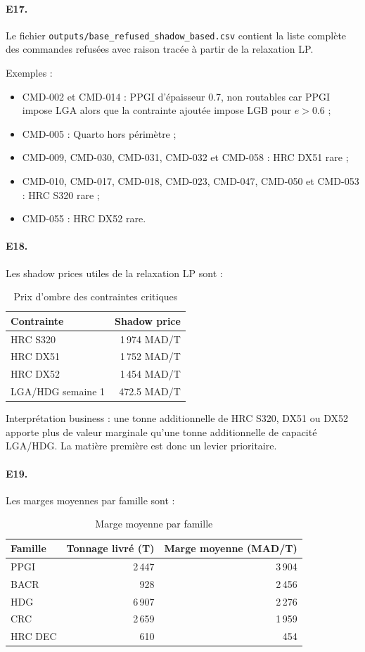 \documentclass[12pt,a4paper]{article}
\newcommand{\question}[1]{\paragraph{\textcolor{blue!50!black}{#1.}}}
\begin{document}
\question{E17}
Le fichier \texttt{outputs/base\_refused\_shadow\_based.csv} contient la liste complète des commandes refusées avec raison tracée à partir de la relaxation LP.

Exemples :

\begin{itemize}
    \item CMD-002 et CMD-014 : PPGI d'épaisseur 0.7, non routables car PPGI impose LGA alors que la contrainte ajoutée impose LGB pour $e>0.6$ ;
    \item CMD-005 : Quarto hors périmètre ;
    \item CMD-009, CMD-030, CMD-031, CMD-032 et CMD-058 : HRC DX51 rare ;
    \item CMD-010, CMD-017, CMD-018, CMD-023, CMD-047, CMD-050 et CMD-053 : HRC S320 rare ;
    \item CMD-055 : HRC DX52 rare.
\end{itemize}

\question{E18}
Les shadow prices utiles de la relaxation LP sont :

\begin{table}[H]
\centering
\caption{Prix d'ombre des contraintes critiques}
\begin{tabular}{lr}
\toprule
Contrainte & Shadow price \\
\midrule
HRC S320 & 1\,974 MAD/T \\
HRC DX51 & 1\,752 MAD/T \\
HRC DX52 & 1\,454 MAD/T \\
LGA/HDG semaine 1 & 472.5 MAD/T \\
\bottomrule
\end{tabular}
\end{table}

Interprétation business : une tonne additionnelle de HRC S320, DX51 ou DX52 apporte plus de valeur marginale qu'une tonne additionnelle de capacité LGA/HDG. La matière première est donc un levier prioritaire.

\question{E19}
Les marges moyennes par famille sont :

\begin{table}[H]
\centering
\caption{Marge moyenne par famille}
\begin{tabular}{lrr}
\toprule
Famille & Tonnage livré (T) & Marge moyenne (MAD/T) \\
\midrule
PPGI & 2\,447 & 3\,904 \\
BACR & 928 & 2\,456 \\
HDG & 6\,907 & 2\,276 \\
CRC & 2\,659 & 1\,959 \\
HRC DEC & 610 & 454 \\
\bottomrule
\end{tabular}
\end{table}
\end{document}

